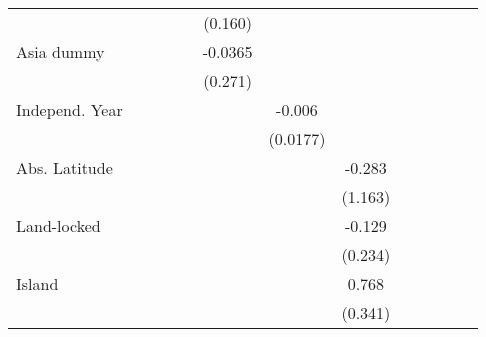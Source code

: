 \begin{sidewaystable}[h!]
\begin{threeparttable}
\begin{center}
\begin{minipage}{\textwidth}
\begin{tabular*}{\textwidth}{@{\extracolsep{\fill}}lcccccccccccc@{\extracolsep{\fill}}}
            &                     &                     &                     &                     &     (0.160)         &                     &                     &                     &                     \\
[0.125em]
Asia dummy        &                     &                     &                     &                     &     -0.0365         &                     &                     &                     &                     \\
            &                     &                     &                     &                     &     (0.271)         &                     &                     &                     &                     \\
[0.125em]
Independ. Year &                     &                     &                     &                     &                     &    -0.006         &                     &                     &                     \\
            &                     &                     &                     &                     &                     &    (0.0177)         &                     &                     &                     \\
[0.125em]
Abs. Latitude    &                     &                     &                     &                     &                     &                     &      -0.283         &                     &                     \\
            &                     &                     &                     &                     &                     &                     &     (1.163)         &                     &                     \\
[0.125em]
Land-locked    &                     &                     &                     &                     &                     &                     &      -0.129         &                     &                     \\
            &                     &                     &                     &                     &                     &                     &     (0.234)         &                     &                     \\
[0.125em]
Island    &                     &                     &                     &                     &                     &                     &       0.768\sym{**} &                     &                     \\
            &                     &                     &                     &                     &                     &                     &     (0.341)         &                     &                     \\

\end{tabular*}
\end{minipage}
\end{center}
\end{threeparttable}
\end{sidewaystable}
